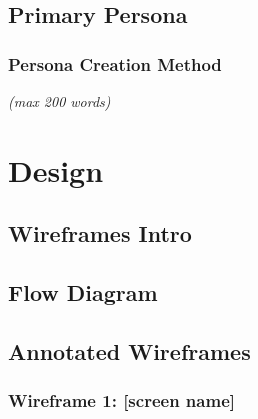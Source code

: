 \documentclass[a4paper,11pt]{article}
\newcommand{\wclimit}[1]{\hfill\textit{\footnotesize(max #1 words)}}
\begin{document}
\newpage
\subsection{Primary Persona}\label{sec:persona}
%

\subsubsection{Persona Creation Method}\label{sec:persona-method}
\wclimit{200}

\newpage
\section{Design}

\subsection{Wireframes Intro}\label{sec:wireframes-intro}

\newpage
\subsection{Flow Diagram}\label{sec:flow}
%

\newpage
\subsection{Annotated Wireframes}\label{sec:wireframes}
%
% 

\subsubsection*{Wireframe 1: [screen name]}
\end{document}
